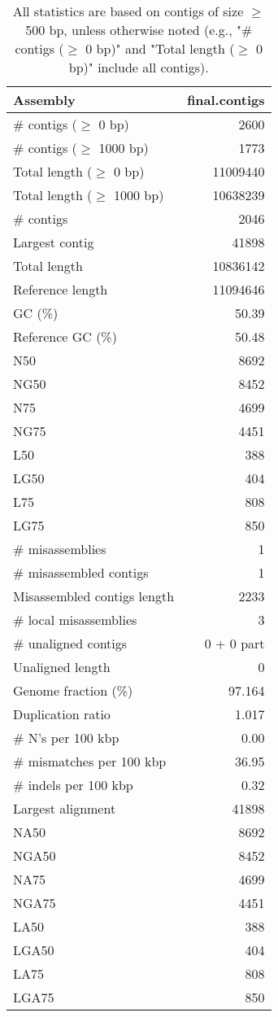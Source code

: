 \documentclass[12pt,a4paper]{article}
\begin{document}
\begin{table}[ht]
\begin{center}
\caption{All statistics are based on contigs of size $\geq$ 500 bp, unless otherwise noted (e.g., "\# contigs ($\geq$ 0 bp)" and "Total length ($\geq$ 0 bp)" include all contigs).}
\begin{tabular}{|l*{1}{|r}|}
\hline
Assembly & final.contigs \\ \hline
\# contigs ($\geq$ 0 bp) & 2600 \\ \hline
\# contigs ($\geq$ 1000 bp) & 1773 \\ \hline
Total length ($\geq$ 0 bp) & 11009440 \\ \hline
Total length ($\geq$ 1000 bp) & 10638239 \\ \hline
\# contigs & 2046 \\ \hline
Largest contig & 41898 \\ \hline
Total length & 10836142 \\ \hline
Reference length & 11094646 \\ \hline
GC (\%) & 50.39 \\ \hline
Reference GC (\%) & 50.48 \\ \hline
N50 & 8692 \\ \hline
NG50 & 8452 \\ \hline
N75 & 4699 \\ \hline
NG75 & 4451 \\ \hline
L50 & 388 \\ \hline
LG50 & 404 \\ \hline
L75 & 808 \\ \hline
LG75 & 850 \\ \hline
\# misassemblies & 1 \\ \hline
\# misassembled contigs & 1 \\ \hline
Misassembled contigs length & 2233 \\ \hline
\# local misassemblies & 3 \\ \hline
\# unaligned contigs & 0 + 0 part \\ \hline
Unaligned length & 0 \\ \hline
Genome fraction (\%) & 97.164 \\ \hline
Duplication ratio & 1.017 \\ \hline
\# N's per 100 kbp & 0.00 \\ \hline
\# mismatches per 100 kbp & 36.95 \\ \hline
\# indels per 100 kbp & 0.32 \\ \hline
Largest alignment & 41898 \\ \hline
NA50 & 8692 \\ \hline
NGA50 & 8452 \\ \hline
NA75 & 4699 \\ \hline
NGA75 & 4451 \\ \hline
LA50 & 388 \\ \hline
LGA50 & 404 \\ \hline
LA75 & 808 \\ \hline
LGA75 & 850 \\ \hline
\end{tabular}
\end{center}
\end{table}
\end{document}
